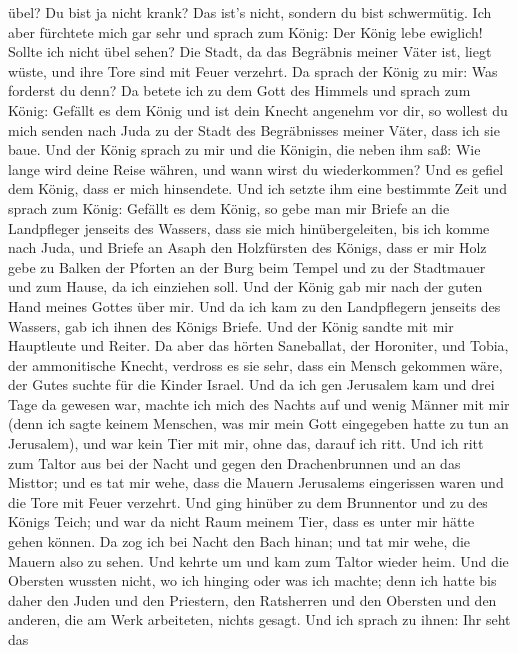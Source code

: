übel? Du bist ja nicht krank? Das ist's nicht, sondern du bist
schwermütig. Ich aber fürchtete mich gar sehr  und sprach
zum König: Der König lebe ewiglich! Sollte ich nicht übel sehen? Die
Stadt, da das Begräbnis meiner Väter ist, liegt wüste, und ihre Tore
sind mit Feuer verzehrt.  Da sprach der König zu mir: Was
forderst du denn? Da betete ich zu dem Gott des Himmels  und
sprach zum König: Gefällt es dem König und ist dein Knecht angenehm vor
dir, so wollest du mich senden nach Juda zu der Stadt des Begräbnisses
meiner Väter, dass ich sie baue.  Und der König sprach zu
mir und die Königin, die neben ihm saß: Wie lange wird deine Reise
währen, und wann wirst du wiederkommen? Und es gefiel dem König, dass er
mich hinsendete. Und ich setzte ihm eine bestimmte Zeit  und
sprach zum König: Gefällt es dem König, so gebe man mir Briefe an die
Landpfleger jenseits des Wassers, dass sie mich hinübergeleiten, bis ich
komme nach Juda,  und Briefe an Asaph den Holzfürsten des
Königs, dass er mir Holz gebe zu Balken der Pforten an der Burg beim
Tempel und zu der Stadtmauer und zum Hause, da ich einziehen soll. Und
der König gab mir nach der guten Hand meines Gottes über mir.
 Und da ich kam zu den Landpflegern jenseits des Wassers,
gab ich ihnen des Königs Briefe. Und der König sandte mit mir Hauptleute
und Reiter.  Da aber das hörten Saneballat, der Horoniter,
und Tobia, der ammonitische Knecht, verdross es sie sehr, dass ein
Mensch gekommen wäre, der Gutes suchte für die Kinder Israel.
 Und da ich gen Jerusalem kam und drei Tage da gewesen war,
 machte ich mich des Nachts auf und wenig Männer mit mir
(denn ich sagte keinem Menschen, was mir mein Gott eingegeben hatte zu
tun an Jerusalem), und war kein Tier mit mir, ohne das, darauf ich ritt.
 Und ich ritt zum Taltor aus bei der Nacht und gegen den
Drachenbrunnen und an das Misttor; und es tat mir wehe, dass die Mauern
Jerusalems eingerissen waren und die Tore mit Feuer verzehrt.
 Und ging hinüber zu dem Brunnentor und zu des Königs
Teich; und war da nicht Raum meinem Tier, dass es unter mir hätte gehen
können.  Da zog ich bei Nacht den Bach hinan; und tat mir
wehe, die Mauern also zu sehen. Und kehrte um und kam zum Taltor wieder
heim.  Und die Obersten wussten nicht, wo ich hinging oder
was ich machte; denn ich hatte bis daher den Juden und den Priestern,
den Ratsherren und den Obersten und den anderen, die am Werk arbeiteten,
nichts gesagt.  Und ich sprach zu ihnen: Ihr seht das
